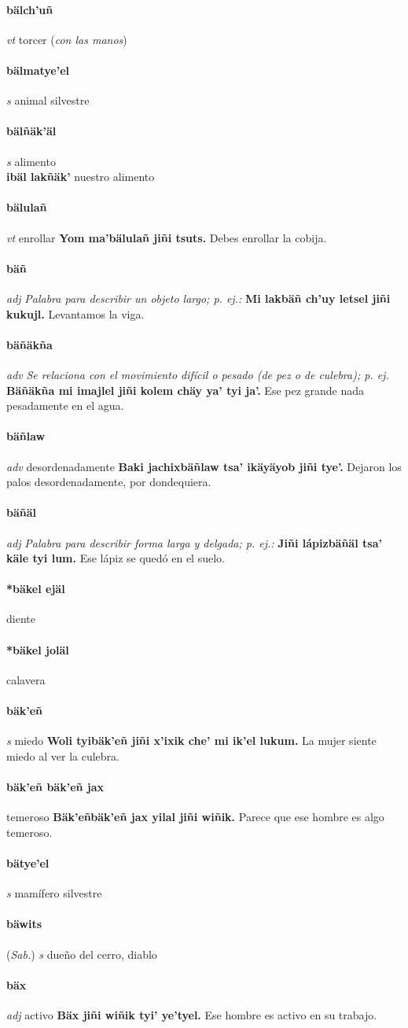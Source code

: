 \documentclass{scrbook}
\newcommand{\entry}[1]{\paragraph{#1}}
\newcommand{\nontranslationdef}[1]{\textit{#1}}
\newcommand{\partofspeech}[1]{\textit{#1}}
\newcommand{\spanishtranslation}[1]{#1}
\newcommand{\clarification}[1]{(\textit{#1})}
\newcommand{\cholexample}[1]{\textbf{#1}}
\newcommand{\exampletranslation}[1]{#1}
\newcommand{\relevantdialect}[1]{(\textit{#1})}
\newcommand{\secondaryentry}[1]{\\\textbf{#1}}
\newcommand{\secondtranslation}[1]{#1}
\begin{document}
\begin{multicols}{2}
\entry{bälch'uñ}
\partofspeech{vt}
\spanishtranslation{torcer}
\clarification{con las manos}

\entry{bälmatye'el}
\partofspeech{s}
\spanishtranslation{animal silvestre}

\entry{bälñäk'äl}
\partofspeech{s}
\spanishtranslation{alimento}
\secondaryentry{ibäl lakñäk'}
\secondtranslation{nuestro alimento}

\entry{bälulañ}
\partofspeech{vt}
\spanishtranslation{enrollar}
\cholexample{Yom ma'bälulañ jiñi tsuts.}
\exampletranslation{Debes enrollar la cobija.}

\entry{bäñ}
\partofspeech{adj}
\nontranslationdef{Palabra para describir un objeto largo; p. ej.:}
\cholexample{Mi lakbäñ ch'uy letsel jiñi kukujl.}
\exampletranslation{Levantamos la viga.}

\entry{bäñäkña}
\partofspeech{adv}
\nontranslationdef{Se relaciona con el movimiento difícil o pesado (de pez o de culebra); p. ej.}
\cholexample{Bäñäkña mi imajlel jiñi kolem chäy ya' tyi ja'.}
\exampletranslation{Ese pez grande nada pesadamente en el agua.}

\entry{bäñlaw}
\partofspeech{adv}
\spanishtranslation{desordenadamente}
\cholexample{Baki jachixbäñlaw tsa' ikäyäyob jiñi tye'.}
\exampletranslation{Dejaron los palos desordenadamente, por dondequiera.}

\entry{bäñäl}
\partofspeech{adj}
\nontranslationdef{Palabra para describir forma larga y delgada; p. ej.:}
\cholexample{Jiñi lápizbäñäl tsa' käle tyi lum.}
\exampletranslation{Ese lápiz se quedó en el suelo.}

\entry{*bäkel ejäl}
\spanishtranslation{diente}

\entry{*bäkel joläl}
\spanishtranslation{calavera}

\entry{bäk'eñ}
\partofspeech{s}
\spanishtranslation{miedo}
\cholexample{Woli tyibäk'eñ jiñi x'ixik che' mi ik'el lukum.}
\exampletranslation{La mujer siente miedo al ver la culebra.}

\entry{bäk'eñ bäk'eñ jax}
\spanishtranslation{temeroso}
\cholexample{Bäk'eñbäk'eñ jax yilal jiñi wiñik.}
\exampletranslation{Parece que ese hombre es algo temeroso.}

\entry{bätye'el}
\partofspeech{s}
\spanishtranslation{mamífero silvestre}

\entry{bäwits}
\relevantdialect{Sab.}
\partofspeech{s}
\spanishtranslation{dueño del cerro, diablo}

\entry{bäx}
\partofspeech{adj}
\spanishtranslation{activo}
\cholexample{Bäx jiñi wiñik tyi' ye'tyel.}
\exampletranslation{Ese hombre es activo en su trabajo.}


\end{multicols}
\end{document}
